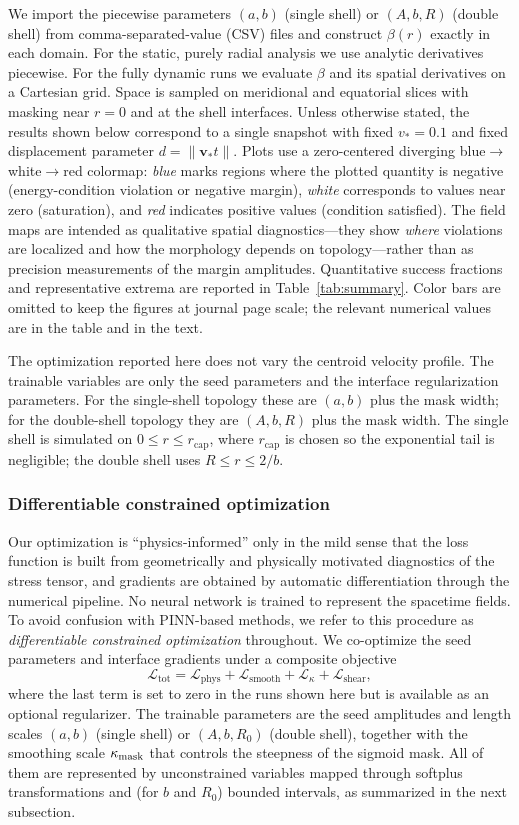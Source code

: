 \documentclass[11pt]{article}
\begin{document}
We import the piecewise parameters $(a,b)$ (single shell) or $(A,b,R)$ (double shell) from comma-separated-value (CSV) files and construct $\beta(r)$ exactly in each domain. For the static, purely radial analysis we use analytic derivatives piecewise. For the fully dynamic runs we evaluate $\beta$ and its spatial derivatives on a Cartesian grid. Space is sampled on meridional and equatorial slices with masking near $r=0$ and at the shell interfaces. Unless otherwise stated, the results shown below correspond to a single snapshot with fixed $v_*=0.1$ and fixed displacement parameter $d=\|\mathbf v_* t\|$. Plots use a zero-centered diverging blue$\to$white$\to$red colormap: \emph{blue} marks regions where the plotted quantity is negative (energy-condition violation or negative margin), \emph{white} corresponds to values near zero (saturation), and \emph{red} indicates positive values (condition satisfied). The field maps are intended as qualitative spatial diagnostics---they show \emph{where} violations are localized and how the morphology depends on topology---rather than as precision measurements of the margin amplitudes. Quantitative success fractions and representative extrema are reported in Table~\ref{tab:summary}. Color bars are omitted to keep the figures at journal page scale; the relevant numerical values are in the table and in the text.

The optimization reported here does not vary the centroid velocity profile. The trainable variables are only the seed parameters and the interface regularization parameters. For the single-shell topology these are $(a,b)$ plus the mask width; for the double-shell topology they are $(A,b,R)$ plus the mask width. The single shell is simulated on $0\le r\le r_{\text{cap}}$, where $r_{\text{cap}}$ is chosen so the exponential tail is negligible; the double shell uses $R\le r\le 2/b$.

\subsubsection{Differentiable constrained optimization}
Our optimization is ``physics-informed'' only in the mild sense that the loss function is built from geometrically and physically motivated diagnostics of the stress tensor, and gradients are obtained by automatic differentiation through the numerical pipeline. No neural network is trained to represent the spacetime fields. To avoid confusion with PINN-based methods, we refer to this procedure as \emph{differentiable constrained optimization} throughout.
We co-optimize the seed parameters and interface gradients under a composite objective
\[
\mathcal{L}_\text{tot} = \mathcal{L}_\text{phys} + \mathcal{L}_\text{smooth} + \mathcal{L}_{\kappa} + \mathcal{L}_\text{shear},
\]
where the last term is set to zero in the runs shown here but is available as an optional regularizer. The trainable parameters are the seed amplitudes and length scales $(a,b)$ (single shell) or $(A,b,R_0)$ (double shell), together with the smoothing scale $\kappa_{\rm mask}$ that controls the steepness of the sigmoid mask. All of them are represented by unconstrained variables mapped through softplus transformations and (for $b$ and $R_0$) bounded intervals, as summarized in the next subsection.
\end{document}
